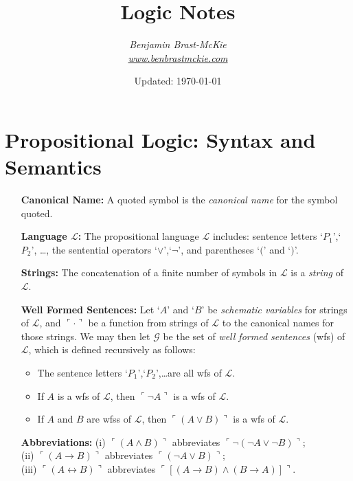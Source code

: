\documentclass[a4paper, 11pt]{article} %
\title{\textbf{Logic Notes}} %
\author{\em Benjamin Brast-McKie\\ \href{http://www.benbrastmckie.com}{www.benbrastmckie.com}} %
\date{Updated: \today} %
\makeatletter
\newcommand{\corner}[1]{\ulcorner#1\urcorner} %
\renewcommand{\maketitle}{ %
\begin{flushright} %
{\@date\hfill \LARGE\@title} %

\vspace{5pt} %

{\@author} %

\end{flushright}
}
\makeatother
\begin{document}
\maketitle %
\thispagestyle{empty}



\section*{\sc Propositional Logic: Syntax and Semantics}

\begin{enumerate}[leftmargin=1.2in,labelsep=.15in] %
\item[\bf Canonical Name:] A quoted symbol is the \textit{canonical name} for the symbol quoted.
\item[\bf Language $\boldsymbol{\mathcal{L}}$:] The propositional language $\mathcal{L}$ includes: sentence letters `$P_1$',`$P_2$', \dots, the sentential operators `$\vee$',`$\neg$', and parentheses `$($' and `$)$'.
\item[\bf Strings:] The concatenation of a finite number of symbols in $\mathcal{L}$ is a \textit{string} of $\mathcal{L}$.
\item[\bf Well Formed Sentences:] Let `$A$' and `$B$' be \textit{schematic variables} for strings of $\mathcal{L}$, and $\corner{\cdot}$ be a function from strings of $\mathcal{L}$ to the canonical names for those strings. We may then let $\mathcal{G}$ be the set of \textit{well formed sentences} (wfs) of $\mathcal{L}$, which is defined recursively as follows:
\begin{itemize}
\item The sentence letters `$P_1$',`$P_2$',\dots are all wfs of $\mathcal{L}$.
\item If ${A}$ is a wfs of $\mathcal{L}$, then $\corner{\neg A}$ is a wfs of $\mathcal{L}$.
\item If ${A}$ and ${B}$ are wfss of $\mathcal{L}$, then $\corner{(A\vee B)}$ is a wfs of $\mathcal{L}$.
\end{itemize}
\item[\bf Abbreviations:] (i) $\corner{(A\wedge B)}$ abbreviates $\corner{\neg(\neg A\vee\neg B)}$;\\ (ii) $\corner{(A\rightarrow B)}$ abbreviates $\corner{(\neg A\vee B)}$;\\ (iii) $\corner{(A\leftrightarrow B)}$ abbreviates $\corner{[(A\rightarrow B)\wedge(B\rightarrow A)]}$.

\end{enumerate}
\end{document}
